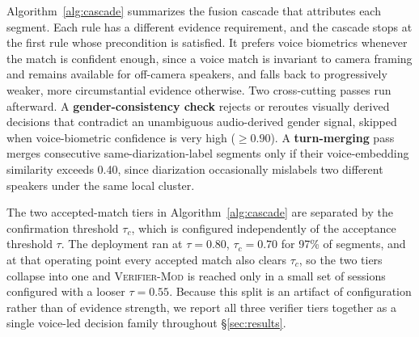 \documentclass[conference]{IEEEtran}
\begin{document}
Algorithm~\ref{alg:cascade} summarizes the fusion cascade that
attributes each segment. Each rule has a different evidence
requirement, and the cascade stops at the first rule whose precondition
is satisfied. It prefers voice biometrics whenever the match is
confident enough, since a voice match is invariant to camera framing
and remains available for off-camera speakers, and falls back to
progressively weaker, more circumstantial evidence otherwise. Two
cross-cutting passes run afterward. A \textbf{gender-consistency check}
rejects or reroutes visually derived decisions that contradict an
unambiguous audio-derived gender signal, skipped when voice-biometric
confidence is very high ($\geq 0.90$). A \textbf{turn-merging} pass
merges consecutive same-diarization-label segments only if their
voice-embedding similarity exceeds 0.40, since diarization occasionally
mislabels two different speakers under the same local cluster.

The two accepted-match tiers in Algorithm~\ref{alg:cascade} are
separated by the confirmation threshold $\tau_c$, which is configured
independently of the acceptance threshold $\tau$. The deployment ran at
$\tau = 0.80$, $\tau_c = 0.70$ for 97\% of segments, and at that
operating point every accepted match also clears $\tau_c$, so the two
tiers collapse into one and \textsc{Verifier-Mod} is reached only in a
small set of sessions configured with a looser $\tau = 0.55$. Because
this split is an artifact of configuration rather than of evidence
strength, we report all three verifier tiers together as a single
voice-led decision family throughout \S\ref{sec:results}.
\end{document}
